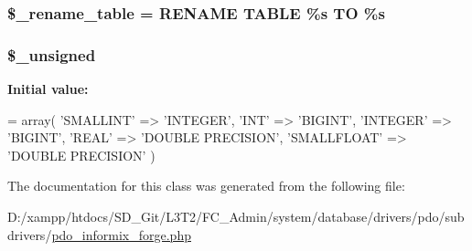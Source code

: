 \subsubsection[{\$\+\_\+rename\+\_\+table}]{\setlength{\rightskip}{0pt plus 5cm}\$\+\_\+rename\+\_\+table = \textquotesingle{}R\+E\+N\+A\+M\+E T\+A\+B\+L\+E \%s T\+O \%s\textquotesingle{}\hspace{0.3cm}{\ttfamily [protected]}}\label{class_c_i___d_b__pdo__informix__forge_a1a649e7cf9de16bcf932977b18bc91de}
\hypertarget{class_c_i___d_b__pdo__informix__forge_aae977ae6d61fa183f0b25422b6ddc31c}{}
\subsubsection[{\$\+\_\+unsigned}]{\setlength{\rightskip}{0pt plus 5cm}\$\+\_\+unsigned\hspace{0.3cm}{\ttfamily [protected]}}\label{class_c_i___d_b__pdo__informix__forge_aae977ae6d61fa183f0b25422b6ddc31c}
{\bfseries Initial value\+:}
\begin{DoxyCode}
= array(
        \textcolor{stringliteral}{'SMALLINT'}  => \textcolor{stringliteral}{'INTEGER'},
        \textcolor{stringliteral}{'INT'}       => \textcolor{stringliteral}{'BIGINT'},
        \textcolor{stringliteral}{'INTEGER'}   => \textcolor{stringliteral}{'BIGINT'},
        \textcolor{stringliteral}{'REAL'}      => \textcolor{stringliteral}{'DOUBLE PRECISION'},
        \textcolor{stringliteral}{'SMALLFLOAT'}    => \textcolor{stringliteral}{'DOUBLE PRECISION'}
    )
\end{DoxyCode}


The documentation for this class was generated from the following file\+:\begin{DoxyCompactItemize}
\item 
D\+:/xampp/htdocs/\+S\+D\+\_\+\+Git/\+L3\+T2/\+F\+C\+\_\+\+Admin/system/database/drivers/pdo/subdrivers/\hyperlink{pdo__informix__forge_8php}{pdo\+\_\+informix\+\_\+forge.\+php}\end{DoxyCompactItemize}
